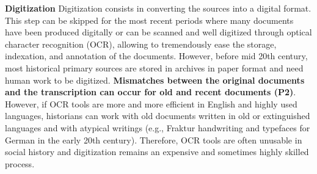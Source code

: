 \noindent\textbf{Digitization}
Digitization consists in converting the sources into a digital format.
This step can be skipped for the most recent periods where many documents have been produced digitally or can be scanned and well digitized through optical character recognition (OCR), allowing to tremendously ease the storage, indexation, and annotation of the documents.
However, before mid 20th century, most historical primary sources are stored in archives in paper format and need human work to be digitized.
\textbf{Mismatches between the original documents and the transcription can occur for old and recent documents (P2)}. However, if OCR tools are more and more efficient in English and highly used languages, historians can work with old documents written in old or extinguished languages and with atypical writings (e.g., Fraktur handwriting and typefaces for German in the early 20th century). Therefore, OCR tools are often unusable in social history and digitization remains an expensive and sometimes highly skilled process.

